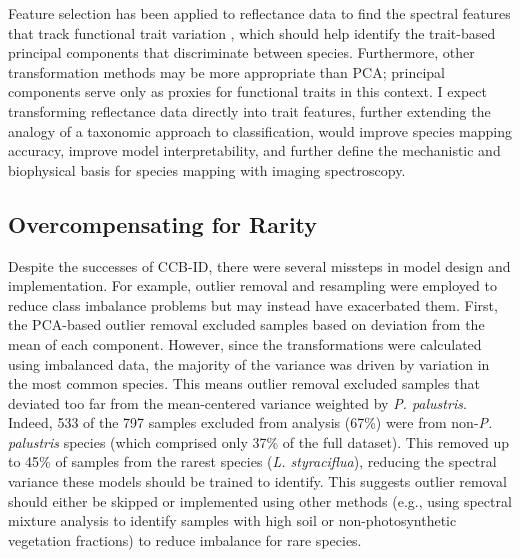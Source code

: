Feature selection has been applied to reflectance data to find the spectral features that track functional trait variation \cite{Feilhauer2015-uk}, which should help identify the trait-based principal components that discriminate between species. Furthermore, other transformation methods may be more appropriate than PCA; principal components serve only as proxies for functional traits in this context. I expect transforming reflectance data directly into trait features, further extending the analogy of a taxonomic approach to classification, would improve species mapping accuracy, improve model interpretability, and further define the mechanistic and biophysical basis for species mapping with imaging spectroscopy.

\subsection{Overcompensating for Rarity}

Despite the successes of CCB-ID, there were several missteps in model design and implementation. For example, outlier removal and resampling were employed to reduce class imbalance problems but may instead have exacerbated them. First, the PCA-based outlier removal excluded samples based on deviation from the mean of each component. However, since the transformations were calculated using imbalanced data, the majority of the variance was driven by variation in the most common species. This means outlier removal excluded samples that deviated too far from the mean-centered variance weighted by \textit{P. palustris}. Indeed, 533 of the 797 samples excluded from analysis (67\%) were from non-\textit{P. palustris} species (which comprised only 37\% of the full dataset). This removed up to 45\% of samples from the rarest species (\textit{L. styraciflua}), reducing the spectral variance these models should be trained to identify. This suggests outlier removal should either be skipped or implemented using other methods (e.g., using spectral mixture analysis to identify samples with high soil or non-photosynthetic vegetation fractions) to reduce imbalance for rare species.

